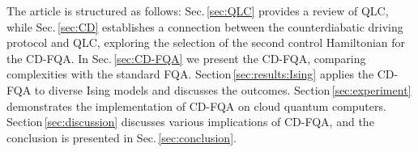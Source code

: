 \documentclass[twocolumn,aps,superscriptaddress,floatfix,longbibliography]{revtex4-2}
\newcommand{\raj}[1]{{\color[rgb]{1,0,1}{#1}}}
\newcommand{\hir}[1]{{\color[rgb]{0.4,0.1,0.6}{#1}}}
\newcommand{\hongye}[1]{{\color[rgb]{0.6,0.1,0.2}{#1}}}
\newcommand{\Sec}[1]{Sec.\,\ref{#1}}
\newcommand{\SEC}[1]{Section\,\ref{#1}}
\begin{document}






The article is structured as follows:
\Sec{sec:QLC} %
provides a review of QLC, while 
\Sec{sec:CD} %
establishes a connection
between the counterdiabatic driving protocol and QLC, exploring
the selection of the second control Hamiltonian for the CD-FQA.
In \Sec{sec:CD-FQA} %
we present the CD-FQA, comparing complexities
with the standard FQA. \SEC{sec:results:Ising} %
applies the CD-FQA to diverse
Ising models and discusses the outcomes. 
\SEC{sec:experiment} %
demonstrates the implementation of CD-FQA on cloud quantum computers.
\SEC{sec:discussion} %
discusses various implications of CD-FQA, and the conclusion is presented
in \Sec{sec:conclusion}. %
\end{document}
